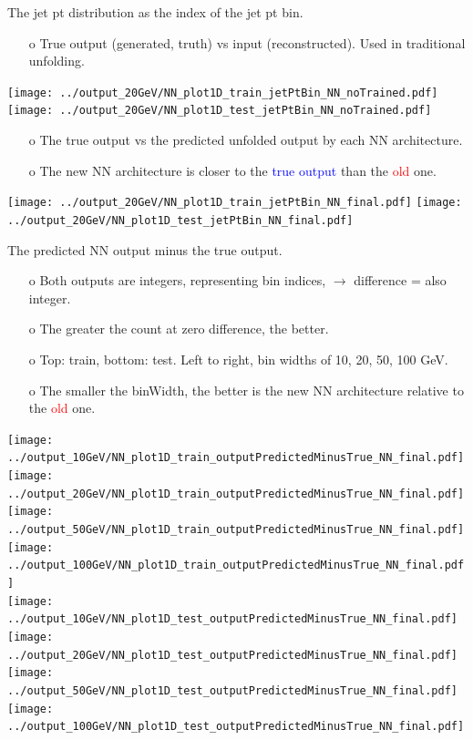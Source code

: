 \begin{frame}{The jet pt distribution as the index of the jet pt bin.}
\begin{enumerate}
\item[o] True output (generated, truth) vs input (reconstructed). Used in traditional unfolding.
\end{enumerate}
\centering
\texttt{[image: ../output\_20GeV/NN\_plot1D\_train\_jetPtBin\_NN\_noTrained.pdf]}
\texttt{[image: ../output\_20GeV/NN\_plot1D\_test\_jetPtBin\_NN\_noTrained.pdf]}
\begin{enumerate}
\item[o] The true output vs the predicted unfolded output by each NN architecture.
\item[o] The \textcolor{OliveGreen}{new} NN architecture is closer to the \textcolor{blue}{true output} than the \textcolor{red}{old} one.
\end{enumerate}
\centering
\texttt{[image: ../output\_20GeV/NN\_plot1D\_train\_jetPtBin\_NN\_final.pdf]}
\texttt{[image: ../output\_20GeV/NN\_plot1D\_test\_jetPtBin\_NN\_final.pdf]}
\end{frame}
\clearpage

\begin{frame}{The predicted NN output minus the true output.}
\begin{enumerate}
\item[o] Both outputs are integers, representing bin indices, $\rightarrow$ difference = also integer.
\item[o] The greater the count at zero difference, the better.
\item[o] Top: train, bottom: test. Left to right, bin widths of 10, 20, 50, 100 GeV.
\item[o] The smaller the binWidth, the better is the \textcolor{OliveGreen}{new} NN architecture relative to the \textcolor{red}{old} one.
\end{enumerate}
\centering
\texttt{[image: ../output\_10GeV/NN\_plot1D\_train\_outputPredictedMinusTrue\_NN\_final.pdf]}
\texttt{[image: ../output\_20GeV/NN\_plot1D\_train\_outputPredictedMinusTrue\_NN\_final.pdf]}
\texttt{[image: ../output\_50GeV/NN\_plot1D\_train\_outputPredictedMinusTrue\_NN\_final.pdf]}
\texttt{[image: ../output\_100GeV/NN\_plot1D\_train\_outputPredictedMinusTrue\_NN\_final.pdf]}\\
\texttt{[image: ../output\_10GeV/NN\_plot1D\_test\_outputPredictedMinusTrue\_NN\_final.pdf]}
\texttt{[image: ../output\_20GeV/NN\_plot1D\_test\_outputPredictedMinusTrue\_NN\_final.pdf]}
\texttt{[image: ../output\_50GeV/NN\_plot1D\_test\_outputPredictedMinusTrue\_NN\_final.pdf]}
\texttt{[image: ../output\_100GeV/NN\_plot1D\_test\_outputPredictedMinusTrue\_NN\_final.pdf]}
\end{frame}
\clearpage

